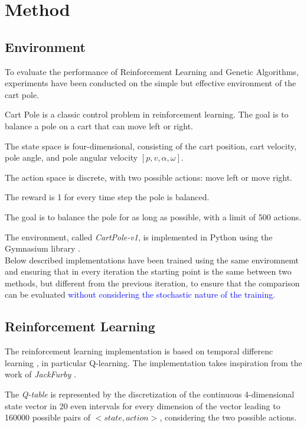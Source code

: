 \section{Method}

\subsection{Environment}

To evaluate the performance of Reinforcement Learning and Genetic Algorithms,
experiments have been conducted on the simple but effective environment of the cart pole.

Cart Pole is a classic control problem in reinforcement learning. 
The goal is to balance a pole on a cart that can move left or right. 

The state space is four-dimensional, consisting of the cart position, cart velocity, pole angle, and pole angular velocity $[p, v, \alpha, \omega]$. 

The action space is discrete, with two possible actions: move left or move right. 

The reward is 1 for every time step the pole is balanced.

The goal is to balance the pole for as long as possible, with a limit of 500 actions.

The environment, called \textit{CartPole-v1}, is implemented in Python using the Gymnasium library \cite{towers_gymnasium_2023}.
\\
Below described implementations have been trained using the same enviromnemt and ensuring that in every iteration the starting point is the same between two methods, but different from the previous iteration, to ensure that the comparison can be evaluated \textcolor{blue}{without considering the stochastic nature of the training}.

\subsection{Reinforcement Learning}
The reinforcement learning implementation is based on temporal differenc learning \cite{sutton1998temporal}, 
in particular Q-learning.
The implementation takes inspiration from the work of \textit{JackFurby} \cite{JackFurbyCartPole}.

The \textit{Q-table} is represented by the discretization of the continuous 4-dimensional state vector in 20 even intervals for every dimension of the vector leading to 160000 possible pairs of $<state,action>$, considering the two possible actions.


